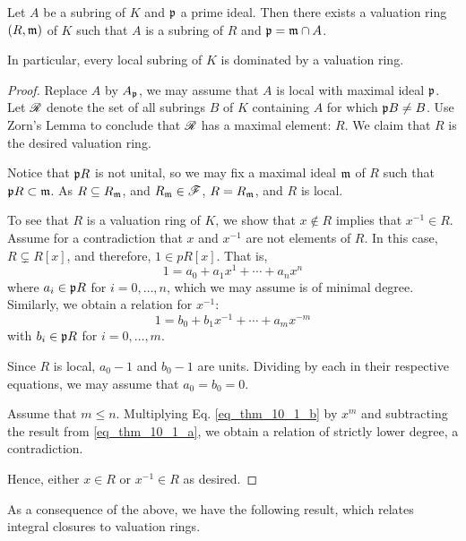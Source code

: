 \begin{thm}\label{mats_val_rng_dom}
Let $A$ be a subring of $K$ and $\mathfrak{p}$ a prime ideal. Then
there exists a valuation ring $(R, \mathfrak{m})$ of $K$ such that 
$A$ is a subring of $R$ and $\mathfrak{p} = \mathfrak{m} \cap A$.

In particular, every local subring of $K$ is dominated by a 
valuation ring.
\end{thm}
\begin{proof}
Replace $A$ by $A_{\mathfrak{p}}$, we may assume \WLOG that $A$ is 
local with maximal ideal $\mathfrak{p}$. Let $\mathscr{R}$ denote the
set of all subrings $B$ of $K$ containing $A$ for which 
$\mathfrak{p}B \neq B$. Use Zorn's Lemma to conclude that 
$\mathscr{R}$ has a maximal element: $R$. We claim that $R$ is the 
desired valuation ring.

Notice that $\mathfrak{p}R$ is not unital, so we may fix a maximal 
ideal $\mathfrak{m}$ of $R$ such that $\mathfrak{p}R \subset \mathfrak{m}$.  
As $R \subseteq R_{\mathfrak{m}}$, and $R_{\mathfrak{m}} \in \mathscr{F}$,
$R = R_{\mathfrak{m}}$, and $R$ is local.

To see that $R$ is a valuation ring of $K$, we show that $x 
\notin R$ implies that $x^{-1} \in R$. Assume for a contradiction
that $x$ and $x^{-1}$ are not elements of $R$. In this case,
$R \subsetneq R[x]$, and therefore, $1 \in pR[x]$. That is,
\begin{equation}\label{eq_thm_10_1_a}
1 = a_0 + a_1x^1 + \cdots + a_nx^n
\end{equation}
where $a_i \in \mathfrak{p}R$ for $i = 0,\dots, n$, which we may 
assume is of minimal degree. Similarly, we obtain a relation for 
$x^{-1}$:
\begin{equation}\label{eq_thm_10_1_b}
1 = b_0 + b_1x^{-1} + \cdots + a_mx^{-m}
\end{equation}
with $b_i \in \mathfrak{p}R$ for $i = 0,\dots, m$.

Since $R$ is local, $a_0 - 1$ and $b_0 - 1$ are units. Dividing
by each in their respective equations, we may assume that $a_0 = 
b_0 = 0$.

Assume \WLOG that $m \leq n$. Multiplying Eq. \ref{eq_thm_10_1_b} 
by $x^m$ and subtracting the result from \ref{eq_thm_10_1_a}, we 
obtain a relation of strictly lower degree, a contradiction.

Hence, either $x \in R$ or $x^{-1} \in R$ as desired.
\end{proof}

As a consequence of the above, we have the following result, 
which relates integral closures to valuation rings.

